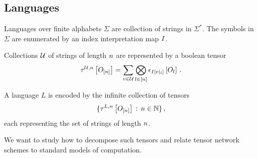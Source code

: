 \subsection{Languages}

Languages over finite alphabets $\Sigma$ are collection of strings in $\Sigma^{*}$.
The symbols in $\Sigma$ are enumerated by an index interpretation map $I$.

Collections $\mathcal{U}$ of strings of length $n$ are represented by a boolean tensor
\begin{align*}
    \tau^{\mathcal{U},n}\left[O_{[n]}\right]
    = \sum_{v\in\mathcal{U}} \bigotimes_{l\in[n]}
    \epsilon_{I\left[{v}|_{l}\right]}\left[O_{l}\right] \, .
\end{align*}

A language $L$ is encoded by the infinite collection of tensors
\begin{align*}
    \{\tau^{L,n}\left[O_{[n]}\right] \,:\, n\in\mathbb{N} \} \, ,
\end{align*}
each representing the set of strings of length $n$.

We want to study how to decompose such tensors and relate tensor network schemes to standard models of computation.